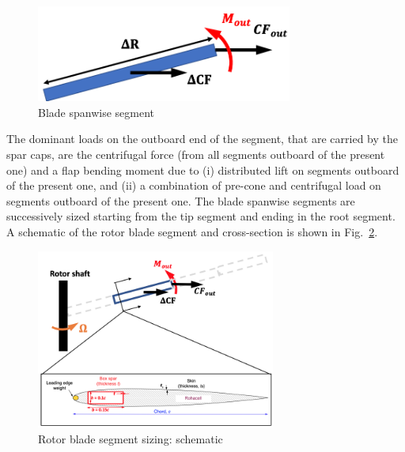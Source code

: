 \begin{figure}
\begin{center}
\includegraphics[width=0.75\textwidth]{images/blade_segment.png}
\vspace{-0.1cm}
\caption{Blade spanwise segment}
\label{fig:blade_segment}
\end{center}
\end{figure}

The dominant loads on the outboard end of the segment, that are carried by the spar caps, are the centrifugal force (from all segments outboard of the present one) and a flap bending moment due to (i) distributed lift on segments outboard of the present one, and (ii) a combination of pre-cone and centrifugal load on segments outboard of the present one. The blade spanwise segments are successively sized starting from the tip segment and ending in the root segment. A schematic of the rotor blade segment and cross-section is shown in Fig.~\ref{fig:blade_sizing}.

\begin{figure}
         \centering
		\includegraphics[width=0.7\textwidth]{images/rotor_sizing.png}
        \caption{Rotor blade segment sizing: schematic}
        \label{fig:blade_sizing}
\end{figure}

